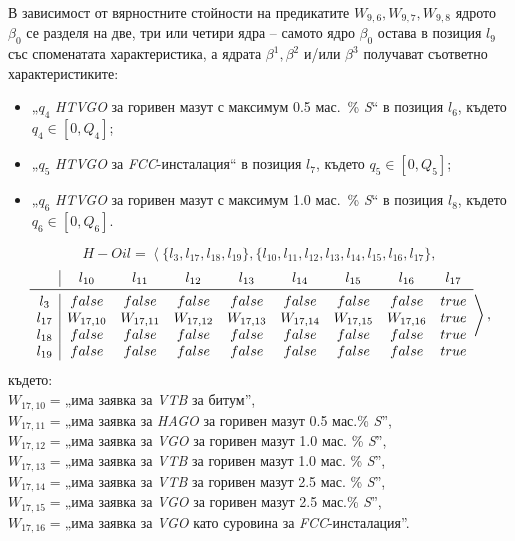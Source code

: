 В зависимост от вярностните стойности на предикатите $W_{9,6}, W_{9,7}, W_{9,8}$ ядрото $\beta_0$ се разделя на две, три или четири ядра -- самото ядро $\beta_0$ остава в позиция $l_9$ със споменатата характеристика, а ядрата $\beta^1, \beta^2$ и/или $\beta^3$ получават съответно характеристиките:
\begin{itemize}
	\item „$q_4$ \textit{HTVGO} за горивен мазут с максимум 0.5 мас.\ \% \textit{S}“ в позиция $l_6$, където $q_4 \in [0, Q_4]$;
	\item „$q_5$ \textit{HTVGO} за \textit{FCC}-инсталация“ в позиция $l_7$, където $q_5 \in [0, Q_5]$;
	\item „$q_6$ \textit{HTVGO} за горивен мазут с максимум 1.0 мас.\ \% \textit{S}“ в позиция $l_8$, където $q_6 \in [0, Q_6]$.
\end{itemize}

$$H\!-\!Oil = \left \langle\{l_{3}, l_{17}, l_{18}, l_{19}\}, \{l_{10}, l_{11}, l_{12}, l_{13}, l_{14}, l_{15}, l_{16}, l_{17} \},\right.$$
$$\left. \begin{array}{c|cccccccc}
	&  l_{10} & l_{11}  & l_{12}    & l_{13}  &  l_{14} & l_{15}  & l_{16}    & l_{17}  \\ \midrule
	l_{3} &false  & false & false & false  & false & false & false & true\\
	l_{17}   & W_{17,10} & W_{17,11}  & W_{17,12} & W_{17,13} & W_{17,14} & W_{17,15}  & W_{17,16} &  true\\
	l_{18} &false  & false & false &false  & false & false & false & true\\
	l_{19} &false  & false & false & false  & false & false & false & true\\
\end{array} \right \rangle , $$
където: \vspace{2mm}\\
$W_{17,10} = $„има заявка за \textit{VTB} за битум”,\\
$W_{17,11} = $„има заявка за \textit{HAGO} за горивен мазут 0.5 мас.\% \textit{S}”,\\
$W_{17,12} = $„има заявка за \textit{VGO} за горивен мазут 1.0 мас. \% \textit{S}”,\\
$W_{17,13} = $„има заявка за \textit{VTB} за горивен мазут 1.0 мас. \% \textit{S}”,\\
$W_{17,14} = $„има заявка за \textit{VTB} за горивен мазут 2.5 мас. \% \textit{S}”,\\
$W_{17,15} = $„има заявка за \textit{VGO} за горивен мазут 2.5 мас.\% \textit{S}”,\\
$W_{17,16} = $„има заявка за \textit{VGO} като суровина за \textit{FCC}-инсталация”.\vspace{2mm}

